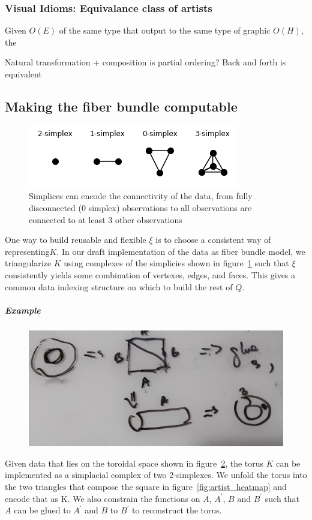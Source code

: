 \documentclass[../main.tex]{subfiles}
\begin{document}
\subsubsection{Visual Idioms: Equivalance class of artists}
Given $O(E)$ of the same type that output to the same type of graphic $O(H)$, the 


Natural transformation + composition is partial ordering? Back and forth is equivalent 


\subsection{Making the fiber bundle computable}
\label{sec:triangulization}

\begin{figure}[h!]
    \includegraphics{figures/math/simplex.png}
    \caption{Simplices can encode the connectivity of the data, from fully disconnected (0 simplex) observations to all observations are connected to at least 3 other observations}
    \label{fig:triangle_simplex}
\end{figure}

One way to build reusable and flexible $\xi$ is to choose a consistent way of representing$K$. In our draft implementation of the data as fiber bundle model, we triangularize $K$ using complexes of the simplicies shown in figure~\ref{fig:triangle_simplex} such that $\xi$ consistently yields some combination of vertexes, edges, and faces. This gives a common data indexing structure on which to build the rest of $Q$.

\subparagraph{Example}
\begin{figure}[h!]
    \includegraphics[width=\textwidth]{figures/math/triangle_torus.png}
    \label{fig:triangle_torus}
\end{figure}

Given data that lies on the toroidal space shown in figure~\ref{fig:triangle_torus}, the torus $K$ can be implemented as a simplacial complex of two 2-simplexes. We unfold the torus into the two triangles that compose the square in figure~\ref{fig:artist_heatmap} and encode that as K. We also constrain the functions on $A$, $A^\prime$, $B$ and $B^\prime$ such that $A$ can be glued to $A^\prime$ and $B$ to $B^\prime$ to reconstruct the torus. 
\end{document}
